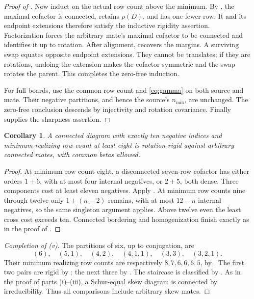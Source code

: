 \documentclass[11pt,a4paper]{amsart}
\numberwithin{equation}{section}
\theoremstyle{plain}
\newtheorem{corollary}[theorem]{Corollary}
\theoremstyle{definition}
\begin{document}
\begin{proof}[Proof of ]
Now induct on the actual row count above the minimum.  By , the maximal cofactor is connected, retains \(\rho(D)\), and has one fewer row.  It and its endpoint extensions therefore satisfy the inductive rigidity assertion.  Factorization forces the arbitrary mate's maximal cofactor to be connected and identifies it up to rotation.  After alignment,  recovers the margins.  A surviving swap equates opposite endpoint extensions.  They cannot be translates; if they are rotations, undoing the extension makes the cofactor symmetric and the swap rotates the parent.  This completes the zero-free induction.

For full boards, use the common row count and \eqref{eq:gamma} on both source and mate.  Their negative partitions, and hence the source's \(n_{\min}\), are unchanged.  The zero-free conclusion descends by injectivity and rotation covariance.  Finally  supplies the sharpness assertion.
\end{proof}

\begin{corollary}\label{cor:ten-negative-high-minimum}
A connected diagram with exactly ten negative indices and minimum
realizing row count at least eight is rotation-rigid against arbitrary
connected mates, with common betas allowed.
\end{corollary}

\begin{proof}
At minimum row count eight, a disconnected seven-row cofactor has either
orders \(1+6\), with at most four internal negatives, or \(2+5\), both
dense.  Three components cost at least eleven negatives.
Apply .
At minimum row counts nine through twelve only \(1+(n-2)\) remains,
with at most \(12-n\) internal negatives, so the same singleton argument
applies.  Above twelve even the least cross cost exceeds ten.
Connected bordering and homogenization finish exactly as in the proof of
.
\end{proof}

\begin{proof}[Completion of (v)]
The partitions of six, up to conjugation, are
\[
 (6),\quad (5,1),\quad (4,2),\quad (4,1,1),\quad (3,3),\quad (3,2,1).
\]
Their minimum realizing row counts are respectively \(8,7,6,6,6,5\),
by .  The first two pairs are rigid by
; the next three by
.  The staircase is classified by
.
As in the proof of parts (i)--(iii), a Schur-equal skew diagram is connected
by irreducibility.  Thus all comparisons include arbitrary skew mates.
\end{proof}
\end{document}
